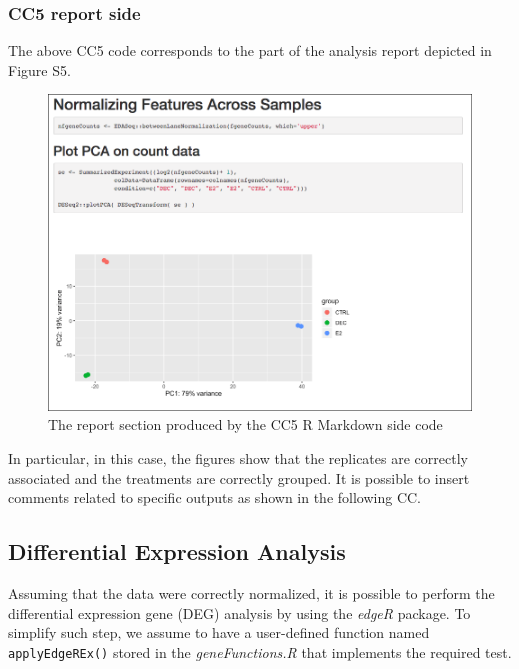 \documentclass[]{article}
\begin{document}
\newpage

\hypertarget{cc5-report-side}{%
\subsubsection{CC5 report side}\label{cc5-report-side}}

The above CC5 code corresponds to the part of the analysis report
depicted in Figure S5.

\begin{figure}[ht]

{\centering \includegraphics[width=0.9\linewidth]{imgs/5} 

}

\caption{The report section produced by the CC5 R Markdown side code}\label{fig:unnamed-chunk-12}
\end{figure}

In particular, in this case, the figures show that the replicates are
correctly associated and the treatments are correctly grouped. It is
possible to insert comments related to specific outputs as shown in the
following CC.

\hypertarget{differential-expression-analysis}{%
\subsection{Differential Expression
Analysis}\label{differential-expression-analysis}}

Assuming that the data were correctly normalized, it is possible to
perform the differential expression gene (DEG) analysis by using the
\emph{edgeR} package. To simplify such step, we assume to have a
user-defined function named \texttt{applyEdgeREx()} stored in the
\emph{geneFunctions.R} that implements the required test.
\end{document}
